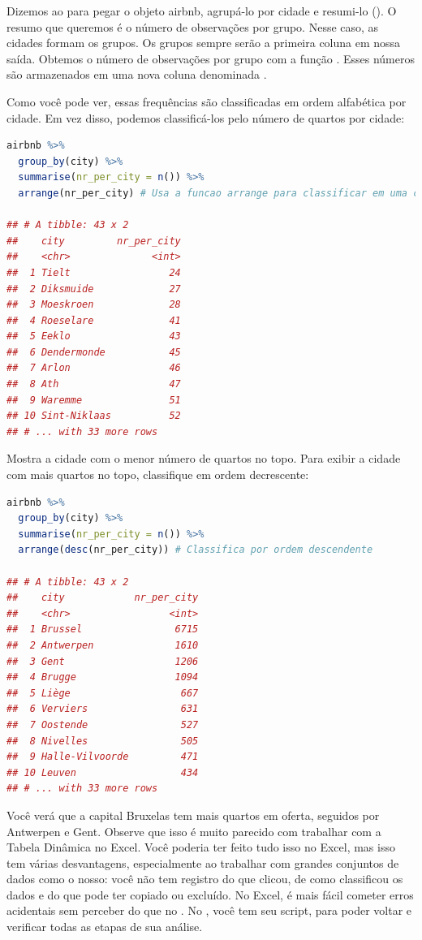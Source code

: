 \documentclass{article}
\begin{document}
Dizemos ao \faRProject para pegar o objeto airbnb, agrupá-lo por cidade e resumi-lo (). O resumo que queremos é o número de observações por grupo. Nesse caso, as cidades formam os grupos. Os grupos sempre serão a primeira coluna em nossa saída. Obtemos o número de observações por grupo com a função . Esses números são armazenados em uma nova coluna denominada .


Como você pode ver, essas frequências são classificadas em ordem alfabética por cidade. Em vez disso, podemos classificá-los pelo número de quartos por cidade:

\begin{lstlisting}[language=R]
airbnb %>% 
  group_by(city) %>%
  summarise(nr_per_city = n()) %>%
  arrange(nr_per_city) # Usa a funcao arrange para classificar em uma coluna selecionada
  
## # A tibble: 43 x 2
##    city         nr_per_city
##    <chr>              <int>
##  1 Tielt                 24
##  2 Diksmuide             27
##  3 Moeskroen             28
##  4 Roeselare             41
##  5 Eeklo                 43
##  6 Dendermonde           45
##  7 Arlon                 46
##  8 Ath                   47
##  9 Waremme               51
## 10 Sint-Niklaas          52
## # ... with 33 more rows  
\end{lstlisting}


Mostra a cidade com o menor número de quartos no topo. Para exibir a cidade com mais quartos no topo, classifique em ordem decrescente:


\begin{lstlisting}[language=R]
airbnb %>% 
  group_by(city) %>%
  summarise(nr_per_city = n()) %>%
  arrange(desc(nr_per_city)) # Classifica por ordem descendente

## # A tibble: 43 x 2
##    city            nr_per_city
##    <chr>                 <int>
##  1 Brussel                6715
##  2 Antwerpen              1610
##  3 Gent                   1206
##  4 Brugge                 1094
##  5 Liège                   667
##  6 Verviers                631
##  7 Oostende                527
##  8 Nivelles                505
##  9 Halle-Vilvoorde         471
## 10 Leuven                  434
## # ... with 33 more rows
\end{lstlisting}

Você verá que a capital Bruxelas tem mais quartos em oferta, seguidos por Antwerpen e Gent. Observe que isso é muito parecido com trabalhar com a Tabela Dinâmica no Excel. Você poderia ter feito tudo isso no Excel, mas isso tem várias desvantagens, especialmente ao trabalhar com grandes conjuntos de dados como o nosso: você não tem registro do que clicou, de como classificou os dados e do que pode ter copiado ou excluído. No Excel, é mais fácil cometer erros acidentais sem perceber do que no \faRProject. No \faRProject, você tem seu script, para poder voltar e verificar todas as etapas de sua análise.
\end{document}
